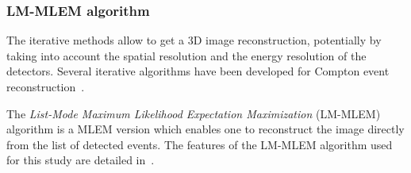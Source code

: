 \subsubsection{LM-MLEM algorithm}	
The iterative methods allow to get a 3D image reconstruction, potentially by taking into account the spatial resolution and the energy resolution of the detectors. Several iterative algorithms have been developed for Compton event reconstruction~\cite{schone_common_2010, zoglauer_design_2011,gillam_compton_2011,mackin_evaluation_2012,lojacono_low_2013, Huang2018, Taya2017, Schoene2017}.

The \textit{List-Mode Maximum Likelihood Expectation Maximization} (LM-MLEM) algorithm is a MLEM version which enables one to reconstruct the image directly from the list of detected events.
The features of the LM-MLEM algorithm used for this study are detailed in~\cite{hilaire_compton_2014}.%


